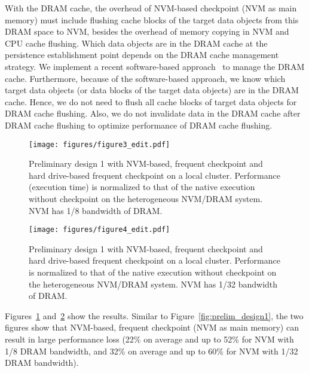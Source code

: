 With the DRAM cache, the overhead of NVM-based checkpoint (NVM as main memory) must include flushing cache blocks of the target data objects from
this DRAM space to NVM, besides the overhead of memory copying in NVM and CPU cache flushing. 
Which data objects are in the DRAM cache at the persistence establishment point depends on the DRAM cache management strategy.
We implement a recent software-based approach~\cite{eurosys16:dulloor} to manage the DRAM cache.
Furthermore, because of the software-based approach, 
we know which target data objects (or data blocks of the target data objects) are in the DRAM cache. Hence, we do not need to flush all cache blocks of target data objects for DRAM cache flushing. Also, we do not invalidate data in the DRAM cache after DRAM cache flushing to optimize performance of DRAM cache flushing.

\begin{figure}
\centering
\texttt{[image: figures/figure3\_edit.pdf]}
\vspace{-20pt}
\caption{Preliminary design 1 with NVM-based, frequent checkpoint and hard drive-based frequent checkpoint on a local cluster. Performance (execution time) is normalized to that of the native execution without checkpoint on the heterogeneous NVM/DRAM system. NVM has 1/8 bandwidth of DRAM.}
\label{fig:prelim_design1_low_nvm}
\vspace{-10pt}
\end{figure}

\begin{figure}
\centering
\texttt{[image: figures/figure4\_edit.pdf]}
\vspace{-20pt}
\caption{Preliminary design 1 with NVM-based, frequent checkpoint and hard drive-based frequent checkpoint on a local cluster. Performance is normalized to that of the native execution without checkpoint on the heterogeneous NVM/DRAM system. NVM has 1/32 bandwidth of DRAM.}
\label{fig:prelim_design1_low_nvm2}
\vspace{-10pt}
\end{figure}

Figures~\ref{fig:prelim_design1_low_nvm} and~\ref{fig:prelim_design1_low_nvm2}
show the results. 
Similar to Figure~\ref{fig:prelim_design1}, the two figures show that NVM-based,
frequent checkpoint (NVM as main memory) can result in large performance loss (22\% on average and up to 52\% for NVM with 1/8 DRAM bandwidth, and 32\% on average and up to 60\% for NVM with 1/32 DRAM bandwidth).

